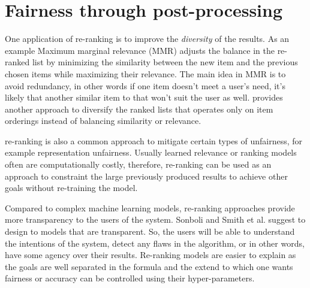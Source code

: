 \chapter{Fairness through post-processing}
\label{fairness_postproc}

One application of re-ranking is to improve the \textit{diversity} of the results. As an example Maximum marginal relevance (MMR) adjusts the balance in the re-ranked list by minimizing the similarity between the new item and the previous chosen items \cite{carbonell1998use} while maximizing their relevance. The main idea in MMR is to avoid redundancy, in other words if one item doesn't meet a user's need, it's likely that another similar item to that won't suit the user as well. \cite{Ziegler:2005:IRL:1060745.1060754} provides another approach to diversify the ranked lists that operates only on item orderings instead of balancing similarity or relevance. 

re-ranking is also a common approach to mitigate certain types of unfairness, for example representation unfairness. Usually learned relevance or ranking models often are computationally costly, therefore, re-ranking can be used as an approach to constraint the large previously produced results to achieve other goals without re-training the model.

Compared to complex machine learning models, re-ranking approaches provide more transparency to the users of the system. Sonboli and Smith et al. \cite{Sonboli2021transparency} suggest to design to models that are transparent. So, the users will be able to understand the intentions of the system, detect any flaws in the algorithm, or in other words, have some agency over their results. Re-ranking models are easier to explain as the goals are well separated in the formula and the extend to which one wants fairness or accuracy can be controlled using their hyper-parameters. 



